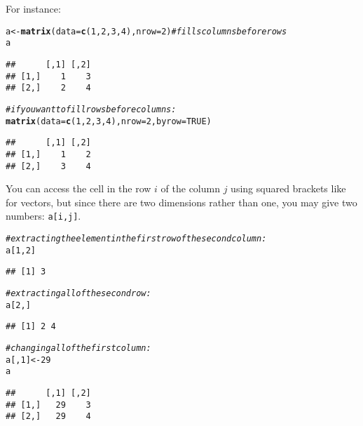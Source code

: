 \documentclass[12pt,a4paper]{scrartcl}\usepackage[]{graphicx}\usepackage[]{color}
\makeatletter
\newcommand{\hlnum}[1]{\textcolor[rgb]{0.686,0.059,0.569}{#1}}%
\newcommand{\hlcom}[1]{\textcolor[rgb]{0.678,0.584,0.686}{\textit{#1}}}%
\newcommand{\hlstd}[1]{\textcolor[rgb]{0.345,0.345,0.345}{#1}}%
\newcommand{\hlkwb}[1]{\textcolor[rgb]{0.69,0.353,0.396}{#1}}%
\newcommand{\hlkwc}[1]{\textcolor[rgb]{0.333,0.667,0.333}{#1}}%
\newcommand{\hlkwd}[1]{\textcolor[rgb]{0.737,0.353,0.396}{\textbf{#1}}}%
\newenvironment{kframe}{%
 \def\at@end@of@kframe{}%
 \ifinner\ifhmode%
  \def\at@end@of@kframe{\end{minipage}}%
  \begin{minipage}{\columnwidth}%
 \fi\fi%
 \def\FrameCommand##1{\hskip\@totalleftmargin \hskip-\fboxsep
 \colorbox{shadecolor}{##1}\hskip-\fboxsep
     \hskip-\linewidth \hskip-\@totalleftmargin \hskip\columnwidth}%
 \MakeFramed {\advance\hsize-\width
   \@totalleftmargin\z@ \linewidth\hsize
   \@setminipage}}%
 {\par\unskip\endMakeFramed%
 \at@end@of@kframe}
\newenvironment{knitrout}{}{} %
\makeatother
\begin{document}
For instance:
\begin{knitrout}
\color{fgcolor}\begin{kframe}
\begin{alltt}
\hlstd{a} \hlkwb{<-} \hlkwd{matrix}\hlstd{(}\hlkwc{data} \hlstd{=} \hlkwd{c}\hlstd{(}\hlnum{1}\hlstd{,}\hlnum{2}\hlstd{,}\hlnum{3}\hlstd{,}\hlnum{4}\hlstd{),} \hlkwc{nrow} \hlstd{=} \hlnum{2}\hlstd{)} \hlcom{#fills columns before rows}
\hlstd{a}
\end{alltt}
\begin{verbatim}
##      [,1] [,2]
## [1,]    1    3
## [2,]    2    4
\end{verbatim}
\begin{alltt}
\hlcom{#if you want to fill rows before columns:}
\hlkwd{matrix}\hlstd{(}\hlkwc{data} \hlstd{=} \hlkwd{c}\hlstd{(}\hlnum{1}\hlstd{,}\hlnum{2}\hlstd{,}\hlnum{3}\hlstd{,}\hlnum{4}\hlstd{),} \hlkwc{nrow} \hlstd{=} \hlnum{2}\hlstd{,} \hlkwc{byrow} \hlstd{=} \hlnum{TRUE}\hlstd{)}
\end{alltt}
\begin{verbatim}
##      [,1] [,2]
## [1,]    1    2
## [2,]    3    4
\end{verbatim}
\end{kframe}
\end{knitrout}

You can access the cell in the row $i$ of the column $j$ using squared brackets like for vectors, but since there are two dimensions rather than one, you may give two numbers: \texttt{a[i,j]}.

\begin{knitrout}
\color{fgcolor}\begin{kframe}
\begin{alltt}
\hlcom{#extracting the element in the first row of the second column:}
\hlstd{a[}\hlnum{1}\hlstd{,}\hlnum{2}\hlstd{]}
\end{alltt}
\begin{verbatim}
## [1] 3
\end{verbatim}
\begin{alltt}
\hlcom{# extracting all of the second row:}
\hlstd{a[}\hlnum{2}\hlstd{,]}
\end{alltt}
\begin{verbatim}
## [1] 2 4
\end{verbatim}
\begin{alltt}
\hlcom{# changing all of the first column:}
\hlstd{a[,}\hlnum{1}\hlstd{]} \hlkwb{<-} \hlnum{29}
\hlstd{a}
\end{alltt}
\begin{verbatim}
##      [,1] [,2]
## [1,]   29    3
## [2,]   29    4
\end{verbatim}
\end{kframe}
\end{knitrout}
\end{document}
